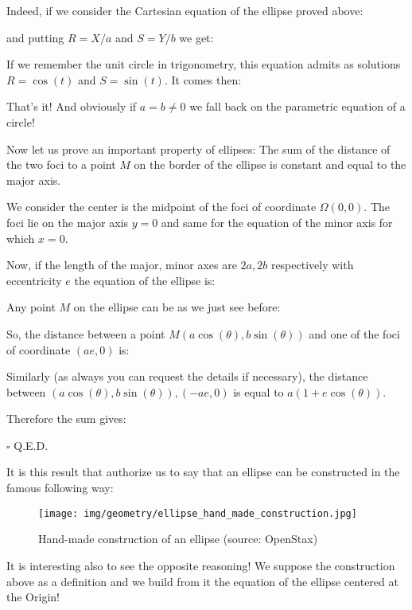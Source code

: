 \begin{enumerate}
		Indeed, if we consider the Cartesian equation of the ellipse proved above:
		
		and putting $R=X/a$ and $S=Y/b$ we get:
		
		If we remember the unit circle in trigonometry, this equation admits as solutions $R=\cos(t)$ and $S=\sin(t)$. It comes then\label{parametric equation of an ellipse}:
		
		That's it! And obviously if $a=b\neq 0$ we fall back on the parametric equation of a circle!
		
		Now let us prove an important property of ellipses: The sum of the distance of the two foci to a point $M$ on the border of the ellipse is constant and equal to the major axis.
		
		\begin{dem}
		We consider the center is the midpoint of the foci of coordinate $\Omega(0,0)$. The foci lie on the major axis $y=0$ and same for the equation of the minor axis for which $x=0$.
		
		Now, if the length of the major, minor axes are $2a,2b$ respectively with eccentricity $e$ the equation of the ellipse is:
		
		Any point $M$ on the ellipse can be as we just see before:
		
		
		So, the distance between a point $M(a\cos(\theta),b\sin(\theta))$ and one of the foci of coordinate $(ae,0)$ is:
		
		Similarly (as always you can request the details if necessary), the distance between $(a\cos(\theta),b\sin(\theta)),(-ae,0)$ is equal to $a(1+e\cos(\theta))$.
		
		Therefore the sum gives:
		
		\begin{flushright}
			$\square$  Q.E.D.
		\end{flushright}
		\end{dem}
		It is this result that authorize us to say that an ellipse can be constructed in the famous following way:
		\begin{figure}[H]
			\centering
			\texttt{[image: img/geometry/ellipse\_hand\_made\_construction.jpg]}
			\caption[Hand-made construction of an ellipse]{Hand-made construction of an ellipse (source: OpenStax)}
		\end{figure}
		It is interesting also to see the opposite reasoning! We suppose the construction above as a definition and we build from it the equation of the ellipse centered at the Origin!
		

\end{enumerate}
